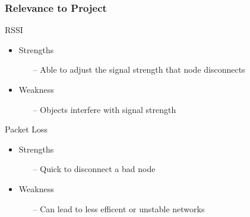 \begin{frame}[t]
  \frametitle{Relevance to Project}
  
  RSSI
  \begin{itemize}
  \item Strengths
    \begin{itemize}
      \item[--] Able to adjust the signal strength that node disconnects
    \end{itemize}
  \item Weakness
    \begin{itemize}
      \item[--] Objects interfere with signal strength
    \end{itemize}
  \end{itemize}

  \vfill

  Packet Loss
  \begin{itemize}
  \item Strengths
    \begin{itemize}
      \item[--] Quick to disconnect a bad node
    \end{itemize}
  \item Weakness
    \begin{itemize}
      \item[--] Can lead to less efficent or unstable networks
    \end{itemize}
  \end{itemize}

  \begin{flushleft}
    \begin{tiny}
      \begin{minipage}{1.0\linewidth}
      \end{minipage}
    \end{tiny}
  \end{flushleft}

\end{frame}
